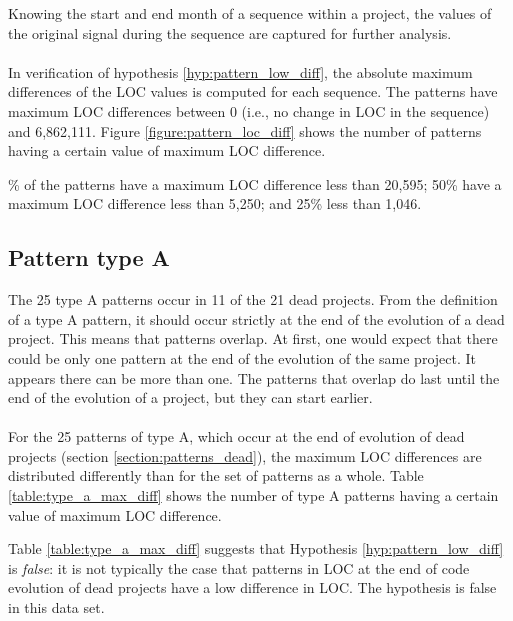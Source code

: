 Knowing the start and end month of a sequence within a project, the values of
the original signal during the sequence are captured for further analysis.

\paragraph{}
In verification of hypothesis \ref{hyp:pattern_low_diff}, the absolute maximum
differences of the LOC values is computed for each sequence. The patterns have
maximum LOC differences between 0 (i.e., no change in LOC in the sequence) and
6,862,111. Figure \ref{figure:pattern_loc_diff} shows the number of patterns
having a certain value of maximum LOC difference.



\% of the patterns have a maximum LOC difference less than 20,595; 50\% have
a maximum LOC difference less than 5,250; and 25\% less than 1,046.

\subsection{Pattern type A}
The 25 type A patterns occur in 11 of the 21 dead projects. From the definition
of a type A pattern, it should occur strictly at the end of the evolution of a
dead project. This means that patterns overlap. At first, one would expect that
there could be only one pattern at the end of the evolution of the same
project. It appears there can be more than one. The patterns that overlap do
last until the end of the evolution of a project, but they can start earlier.

\paragraph{}
For the 25 patterns of type A, which occur at the end of evolution of dead
projects (section \ref{section:patterns_dead}), the maximum LOC differences are
distributed differently than for the set of patterns as a whole. Table
\ref{table:type_a_max_diff} shows the number of type A patterns having a
certain value of maximum LOC difference.



\noindent
Table \ref{table:type_a_max_diff} suggests that Hypothesis
\ref{hyp:pattern_low_diff} is \emph{false}\rm: it is not typically the case
that patterns in LOC at the end of code evolution of dead projects have a low
difference in LOC. The hypothesis is false in this data set.

